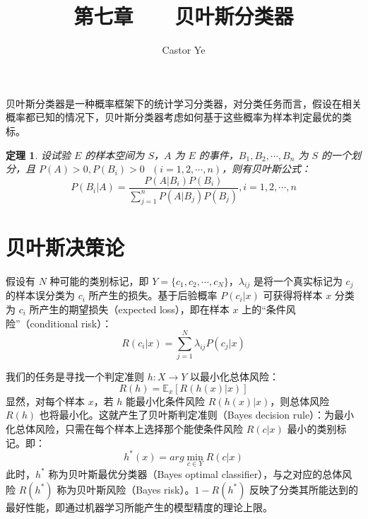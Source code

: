 \documentclass[12pt, a4paper]{article} %
\title{第七章 \ \ \ 贝叶斯分类器} %
\author{Castor Ye} %
\date{} %
\begin{document}
\maketitle %
\newtheorem{definition}{定义}[section]
\newtheorem{theorem}{定理}[section]
\newtheorem{example}{例}[section]
\newtheorem{solution}{题解}
\newtheorem{algorithm}{算法}
\newtheorem{axiom}{公理}
\newtheorem{property}{性质}
\newtheorem{proposition}{命题}
\newtheorem{lemma}{引理}
\newtheorem{corollary}{推论}[section]
\newtheorem{remark}{注解}
\newtheorem{condition}{条件}
\newtheorem{conclusion}{结论}
\newtheorem{assumption}{假设}
\renewcommand{\figurename}{图} %
\renewcommand{\tablename}{表} %
贝叶斯分类器是一种概率框架下的统计学习分类器，对分类任务而言，假设在相关概率都已知的情况下，贝叶斯分类器考虑如何基于这些概率为样本判定最优的类标。

\begin{theorem}
    设试验 $E$ 的样本空间为 $S$，$A$ 为 $E$ 的事件，$B_1, B_2, \cdots, B_n$ 为 $S$ 的一个划分，且 $P(A) > 0, P(B_i) > 0 \ \ \ (i = 1, 2, \cdots, n)$，则有贝叶斯公式：
    \begin{equation*}
        P(B_i | A) = \frac{P(A|B_i) P(B_i)}{\displaystyle \sum_{j = 1}^{n} P(A | B_j) P(B_j)}, i = 1, 2, \cdots, n
    \end{equation*} 
\end{theorem}

\section{贝叶斯决策论}

假设有 $N$ 种可能的类别标记，即 $Y = \{c_1, c_2, \cdots, c_N\}$，$\lambda_{ij}$ 是将一个真实标记为 $c_j$ 的样本误分类为 $c_i$ 所产生的损失。基于后验概率 $P(c_i | x)$ 可获得将样本 $x$ 分类为 $c_i$ 所产生的期望损失（expected loss），即在样本 $x$ 上的“条件风险”（conditional risk）：
\begin{equation*}
    R(c_i | x) = \sum_{j = 1}^{N} \lambda_{ij} P(c_j | x)
\end{equation*}

我们的任务是寻找一个判定准则 $h: X \to Y$ 以最小化总体风险：
\begin{equation*}
    R(h) = \mathbb{E}_{x} [R(h(x) | x)]
\end{equation*}
显然，对每个样本 $x$，若 $h$ 能最小化条件风险 $R(h(x) | x)$，则总体风险 $R(h)$ 也将最小化。这就产生了贝叶斯判定准则（Bayes decision rule）：为最小化总体风险，只需在每个样本上选择那个能使条件风险 $R(c | x)$ 最小的类别标记。即：
\begin{equation*}
    h^* (x) = arg \min_{c \in Y} R(c | x)
\end{equation*}
此时，$h^*$ 称为贝叶斯最优分类器（Bayes optimal classifier），与之对应的总体风险 $R(h^*)$ 称为贝叶斯风险（Bayes risk）。$1 - R(h^*)$ 反映了分类其所能达到的最好性能，即通过机器学习所能产生的模型精度的理论上限。
\end{document}
